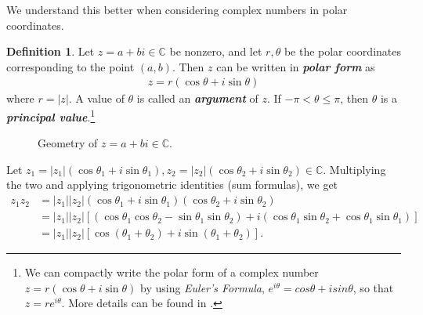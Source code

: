 \documentclass[12pt]{article}
\theoremstyle{plain}
\theoremstyle{definition}
\newtheorem{defn}[thm]{Definition}
\begin{document}
We understand this better when considering complex numbers in polar coordinates.

\begin{defn}
Let $z=a+bi\in \mathbb{C}$ be nonzero, and let $r,\theta$ be the polar coordinates corresponding to the point $(a,b)$. Then $z$ can be written in \textbf{\textit{polar form}} as
\begin{align*}
    z = r(\cos\theta + i\sin\theta)
\end{align*}
where $r=|z|$. A value of $\theta$ is called an \textbf{\textit{argument}} of $z$. If $-\pi<\theta \leq \pi$, then $\theta$ is a \textbf{\textit{principal value}}.\footnote{We can compactly write the polar form of a complex number $z=r(\cos\theta+i\sin\theta)$ by using \textit{Euler's Formula}, $e^{i\theta}=cos\theta + isin\theta$, so that $z=re^{i\theta}$. More details can be found in \cite{brown}.} 
\end{defn}

\begin{figure}[h]
    \centering
    \caption{Geometry of $z=a+bi\in \mathbb{C}$.}
    \label{fig:polarComplex}
\end{figure}

Let $z_1 = |z_1|(\cos\theta_1 + i\sin\theta_1), z_2 = |z_2|(\cos\theta_2+i\sin\theta_2) \in \mathbb{C}$. Multiplying the two and applying trigonometric identities (sum formulas), we get
\begin{align*}
    z_1z_2 &= |z_1||z_2|(\cos\theta_1 + i\sin\theta_1)(\cos\theta_2+i\sin\theta_2) \\
        &= |z_1||z_2|[(\cos\theta_1\cos\theta_2 - \sin\theta_1\sin\theta_2) + i(\cos\theta_1\sin\theta_2 + \cos\theta_1\sin\theta_1)] \\
        &= |z_1||z_2|[\cos(\theta_1 + \theta_2) + i\sin(\theta_1+\theta_2)].
\end{align*}
\end{document}

